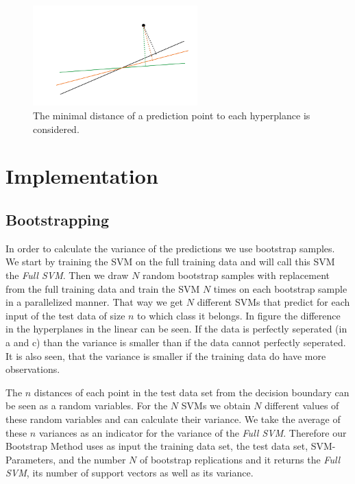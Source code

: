 \documentclass[a4paper]{article}
\begin{document}
\begin{figure}[!htb]
\begin{center}
\includegraphics[width=2.5in]{abb/distances.jpg}
\caption{The minimal distance of a prediction point to each hyperplance is considered.}
\label{fig1}
\end{center}
\end{figure}




\section{Implementation}

\subsection{Bootstrapping}
In order to calculate the variance of the predictions we use bootstrap samples. We start by training the SVM on the full training data and will call this SVM the \textit{Full SVM}. Then we draw $N$ random bootstrap samples with replacement\cite{christmann_bootstrap_2013} from the full training data and train the SVM $N$ times on each bootstrap sample in a parallelized manner. That way we get $N$ different SVMs that predict for each input of the test data of size $n$ to which class it belongs. In figure \label{fig2} the difference in the hyperplanes in the linear can be seen. If the data is perfectly seperated (in a and c) than the variance is smaller than if the data cannot perfectly seperated. It is also seen, that the variance is smaller if the training data do have more observations.

The $n$ distances of each point in the test data set from the decision boundary can be seen as a random variables. For the $N$ SVMs we obtain $N$ different values of these random variables and can calculate their variance. We take the average of these $n$ variances as an indicator for the variance of the \textit{Full SVM}. Therefore our Bootstrap Method uses as input the training data set, the test data set, SVM-Parameters, and the number $N$ of bootstrap replications and it returns the \textit{Full SVM}, its number of support vectors as well as its variance.
\end{document}
